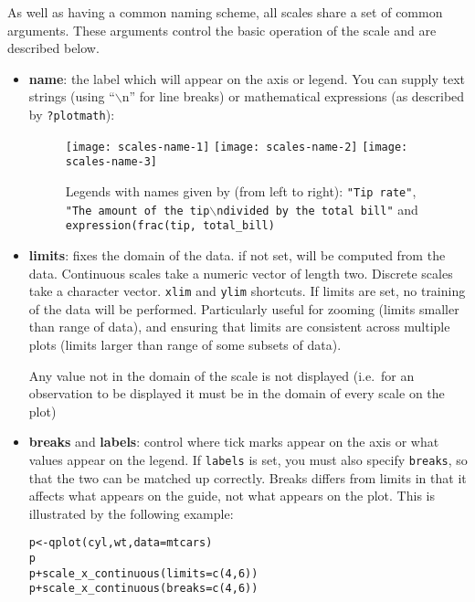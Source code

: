 As well as having a common naming scheme, all scales share a set of common arguments.  These arguments control the basic operation of the scale and are described below.

\begin{itemize}
  \item {\bf name}:  the label which will appear on the axis or legend. You can supply text strings (using ``$\backslash$n'' for line breaks) or mathematical expressions (as described by \verb|?plotmath|):
  
  \begin{figure}[htbp]
    \centering
      \texttt{[image: scales-name-1]}
      \texttt{[image: scales-name-2]}
      \texttt{[image: scales-name-3]}
    \caption{Legends with names given by (from left to right): {\tt "Tip rate"}, {\tt "The amount of the tip$\backslash$ndivided by the total bill"} and {\tt expression(frac(tip, total\_bill)} }
    \label{fig:label}
  \end{figure}
  

  \item {\bf limits}: fixes the domain of the data.  if not set, will be computed from the data.    Continuous scales take a numeric vector of length two.  Discrete scales take a character vector.  {\tt xlim} and {\tt ylim} shortcuts.  If limits are set, no training of the data will be performed.  Particularly useful for zooming (limits smaller than range of data), and ensuring that limits are consistent across multiple plots (limits larger than range of some subsets of data).  
  
  Any value not in the domain of the scale is not displayed (i.e.\ for an observation to be displayed it must be in the domain of every scale on the plot)

  \item {\bf breaks} and {\bf labels}: control where tick marks appear on the axis or what values appear on the legend.  If {\tt labels} is set, you must also specify {\tt breaks}, so that the two can be matched up correctly.  Breaks differs from limits in that it affects what appears on the guide, not what appears on the plot.  This is illustrated by the following example:
  
  \begin{alltt}
    p <- qplot(cyl, wt, data = mtcars)
    p
    p + scale_x_continuous(limits = c(4, 6))
    p + scale_x_continuous(breaks = c(4, 6))
  \end{alltt}
  
\end{itemize}

